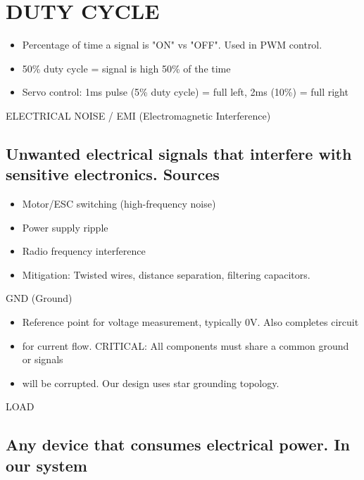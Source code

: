 \documentclass[11pt,letterpaper]{article}
\begin{document}
\section{DUTY CYCLE}

\begin{itemize}
  \item Percentage of time a signal is "ON" vs "OFF". Used in PWM control.
  \item 50\% duty cycle = signal is high 50\% of the time
  \item Servo control: 1ms pulse (5\% duty cycle) = full left, 2ms (10\%) = full right
\end{itemize}

ELECTRICAL NOISE / EMI (Electromagnetic Interference)\par

\subsection{Unwanted electrical signals that interfere with sensitive electronics. Sources}

\begin{itemize}
  \item Motor/ESC switching (high-frequency noise)
  \item Power supply ripple
  \item Radio frequency interference
  \item Mitigation: Twisted wires, distance separation, filtering capacitors.
\end{itemize}

GND (Ground)\par

\begin{itemize}
  \item Reference point for voltage measurement, typically 0V. Also completes circuit
  \item for current flow. CRITICAL: All components must share a common ground or signals
  \item will be corrupted. Our design uses star grounding topology.
\end{itemize}

LOAD\par

\subsection{Any device that consumes electrical power. In our system}
\end{document}
